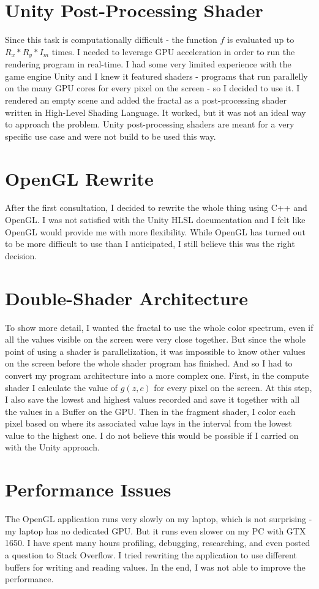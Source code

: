 \documentclass[11pt,a4paper,twoside,openright]{report}
\begin{document}
\section{Unity Post-Processing Shader}
Since this task is computationally difficult - the function $f$ is evaluated up to $R_x * R_y * I_m$ times. I needed to leverage GPU acceleration in order to run the rendering program in real-time. I had some very limited experience with the game engine Unity and I knew it featured shaders - programs that run parallelly on the many GPU cores for every pixel on the screen - so I decided to use it. I rendered an empty scene and added the fractal as a post-processing shader written in High-Level Shading Language. It worked, but it was not an ideal way to approach the problem. Unity post-processing shaders are meant for a very specific use case and were not build to be used this way.
\section{OpenGL Rewrite}
After the first consultation, I decided to rewrite the whole thing using C++ and OpenGL. I was not satisfied with the Unity HLSL documentation and I felt like OpenGL would provide me with more flexibility. While OpenGL has turned out to be more difficult to use than I anticipated, I still believe this was the right decision.
\section{Double-Shader Architecture}
\label{section:ds_architecture}
To show more detail, I wanted the fractal to use the whole color spectrum, even if all the values visible on the screen were very close together. But since the whole point of using a shader is parallelization, it was impossible to know other values on the screen before the whole shader program has finished. And so I had to convert my program architecture into a more complex one. First, in the compute shader I calculate the value of $g(z,c)$ for every pixel on the screen. At this step, I also save the lowest and highest values recorded and save it together with all the values in a Buffer on the GPU. Then in the fragment shader, I color each pixel based on where its associated value lays in the interval from the lowest value to the highest one. I do not believe this would be possible if I carried on with the Unity approach.
\section{Performance Issues}
The OpenGL application runs very slowly on my laptop, which is not surprising - my laptop has no dedicated GPU. But it runs even slower on my PC with GTX 1650. I have spent many hours profiling, debugging, researching, and even posted a question to Stack Overflow. I tried rewriting the application to use different buffers for writing and reading values. In the end, I was not able to improve the performance. 
\end{document}
